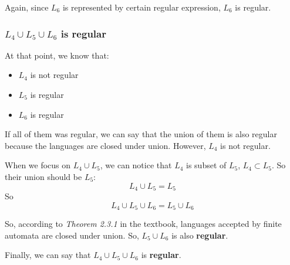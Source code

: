\documentclass{article}
\begin{document}
\quad Again, since $L_6$ is represented by certain regular expression, $L_6$ is regular.

\subsubsection*{$L_4 \cup L_5 \cup L_6$ is regular}

\quad At that point, we know that:
\begin{itemize}
  \item $L_4$ is not regular
  \item $L_5$ is regular
  \item $L_6$ is regular
\end{itemize}

If all of them was regular, we can say that the union of them is also regular because the languages are closed under union. However, $L_4$ is not regular.

When we focus on $L_4 \cup L_5$, we can notice that $L_4$ is subset of $L_5$, $L_4 \subset L_5$. So their union should be $L_5$:
\begin{equation*}
  L_4 \cup L_5 = L_5
\end{equation*}
So
\begin{equation*}
  L_4 \cup L_5 \cup L_6 = L_5 \cup L_6
\end{equation*}

So, according to \textit{Theorem 2.3.1} in the textbook, languages accepted by finite automata are closed under union. So, $L_5 \cup L_6$ is also \textbf{regular}.

Finally, we can say that $L_4 \cup L_5 \cup L_6$ is \textbf{regular}.
\end{document}
